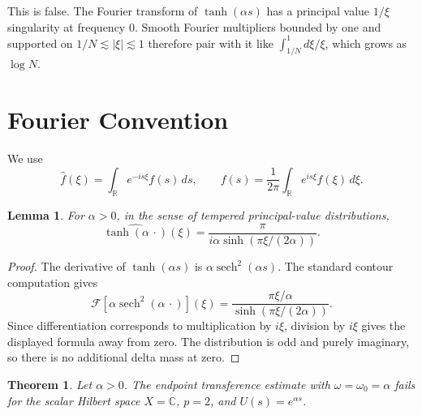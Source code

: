 \documentclass[11pt]{article}
\newtheorem{theorem}{Theorem}
\newtheorem{lemma}{Lemma}
\newcommand{\R}{\mathbb R}
\newcommand{\C}{\mathbb C}
\newcommand{\sech}{\operatorname{sech}}
\newcommand{\calF}{\mathcal F}
\begin{document}
This is false. The Fourier transform of \(\tanh(\alpha s)\) has a principal
value \(1/\xi\) singularity at frequency \(0\). Smooth Fourier multipliers
bounded by one and supported on \(1/N\lesssim |\xi|\lesssim 1\) therefore pair
with it like \(\int_{1/N}^1 d\xi/\xi\), which grows as \(\log N\).

\section*{Fourier Convention}

We use
\[
  \widehat f(\xi)=\int_\R e^{-is\xi}f(s)\,ds,\qquad
  f(s)=\frac1{2\pi}\int_\R e^{is\xi}\widehat f(\xi)\,d\xi.
\]

\begin{lemma}\label{lem:tanh}
For \(\alpha>0\), in the sense of tempered principal-value distributions,
\[
  \widehat{\tanh(\alpha\,\cdot)}(\xi)
  =
  \frac{\pi}{i\alpha\sinh(\pi\xi/(2\alpha))}.
\]
\end{lemma}

\begin{proof}
The derivative of \(\tanh(\alpha s)\) is \(\alpha\sech^2(\alpha s)\).
The standard contour computation gives
\[
  \calF[\alpha\sech^2(\alpha\,\cdot)](\xi)
  =
  \frac{\pi\xi/\alpha}{\sinh(\pi\xi/(2\alpha))}.
\]
Since differentiation corresponds to multiplication by \(i\xi\), division by
\(i\xi\) gives the displayed formula away from zero. The distribution is odd
and purely imaginary, so there is no additional delta mass at zero.
\end{proof}

\begin{theorem}
Let \(\alpha>0\). The endpoint transference estimate with
\(\omega=\omega_0=\alpha\) fails for the scalar Hilbert space \(X=\C\), \(p=2\),
and \(U(s)=e^{\alpha s}\).
\end{theorem}
\end{document}
